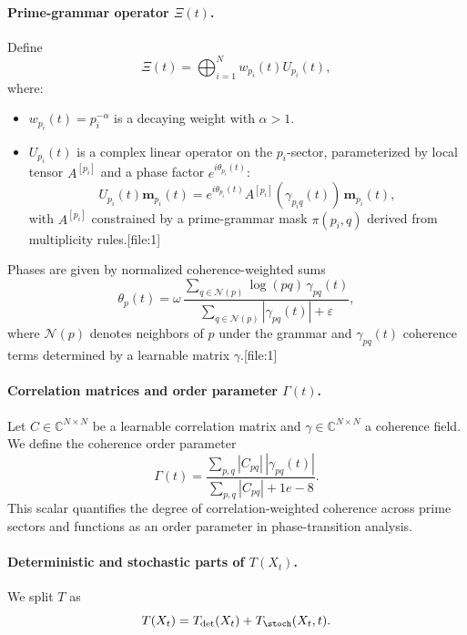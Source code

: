 \documentclass[11pt]{article}
\begin{document}
\paragraph{Prime-grammar operator $\Xi(t)$.}
Define
\[
\Xi(t) = \bigoplus_{i=1}^N w_{p_i}(t) U_{p_i}(t),
\]
where:
\begin{itemize}[leftmargin=1.5em]
\item $w_{p_i}(t)=p_i^{-\alpha}$ is a decaying weight with $\alpha>1$.
\item $U_{p_i}(t)$ is a complex linear operator on the $p_i$-sector, parameterized by local tensor $A^{[p_i]}$ and a phase factor $e^{i\theta_{p_i}(t)}$:
\[
U_{p_i}(t)\mathbf{m}_{p_i}(t)= e^{i\theta_{p_i}(t)}A^{[p_i]}(\gamma_{p_iq}(t))\,\mathbf{m}_{p_i}(t),
\]
with $A^{[p_i]}$ constrained by a prime-grammar mask $\pi(p_i,q)$ derived from multiplicity rules.[file:1]
\end{itemize}

Phases are given by normalized coherence-weighted sums
\[
\theta_{p}(t) = \omega\,
\frac{\sum_{q\in\mathcal{N}(p)} \log(pq)\,\gamma_{pq}(t)}{\sum_{q\in\mathcal{N}(p)}|\gamma_{pq}(t)|+\varepsilon},
\]
where $\mathcal{N}(p)$ denotes neighbors of $p$ under the grammar and $\gamma_{pq}(t)$ coherence terms determined by a learnable matrix $\gamma$.[file:1]

\paragraph{Correlation matrices and order parameter $\Gamma(t)$.}
Let $C\in\mathbb{C}^{N\times N}$ be a learnable correlation matrix and $\gamma\in\mathbb{C}^{N\times N}$ a coherence field. We define the coherence order parameter
\[
\Gamma(t) = \frac{\sum_{p,q}|C_{pq}|\,|\gamma_{pq}(t)|}{\sum_{p,q}|C_{pq}| + 1e-8}.
\]
This scalar quantifies the degree of correlation-weighted coherence across prime sectors and functions as an order parameter in phase-transition analysis.

\paragraph{Deterministic and stochastic parts of $T(X_t)$.}

We split $T$ as
\[
T(X_t) = T_{\det}(X_t) + T_{\stoch}(X_t,t).
\]
\end{document}
